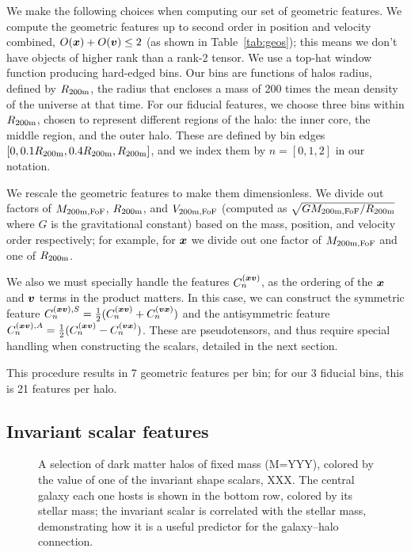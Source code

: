 We make the following choices when computing our set of geometric features.
We compute the geometric features up to second order in position and velocity combined, $O(\bm{x}) + O(\bm{v}) \leq 2$ (as shown in Table~\ref{tab:geos}); this means we don't have objects of higher rank than a rank-2 tensor.
We use a top-hat window function producing hard-edged bins. 
Our bins are functions of halos radius, defined by $R_\mathrm{200m}$, the radius that encloses a mass of 200 times the mean density of the universe at that time.
For our fiducial features, we choose three bins within $R_\mathrm{200m}$, chosen to represent different regions of the halo: the inner core, the middle region, and the outer halo.
These are defined by bin edges $[0, 0.1R_\mathrm{200m}, 0.4R_\mathrm{200m}, R_\mathrm{200m}]$, and we index them by $n=[0,1,2]$ in our notation.

We rescale the geometric features to make them dimensionless.
We divide out factors of $M_\mathrm{200m,FoF}$, $R_\mathrm{200m}$, and $V_\mathrm{200m,FoF}$ (computed as $\sqrt{GM_\mathrm{200m,FoF}/R_\mathrm{200m}}$ where $G$ is the gravitational constant) based on the mass, position, and velocity order respectively; for example, for $\bm{x}$ we divide out one factor of $M_\mathrm{200m,FoF}$ and one of $R_\mathrm{200m}$.

We also we must specially handle the features $C^{(\bm{x}\bm{v})}_n$, as the ordering of the $\bm{x}$ and $\bm{v}$ terms in the product matters.
In this case, we can construct the symmetric feature $ C^{(\bm{x}\bm{v}),S}_n = \frac{1}{2} (C^{(\bm{x}\bm{v})}_n + C^{(\bm{v}\bm{x})}_n)$ and the antisymmetric feature $C^{(\bm{x}\bm{v}),A}_n = \frac{1}{2} (C^{(\bm{x}\bm{v})}_n - C^{(\bm{v}\bm{x})}_n)$.
These are pseudotensors, and thus require special handling when constructing the scalars, detailed in the next section.

This procedure results in 7 geometric features per bin; for our 3 fiducial bins, this is 21 features per halo.

\subsection{Invariant scalar features}
\label{sec:scalar_features}

\begin{figure}
    \centering
    \caption{A selection of dark matter halos of fixed mass (M=YYY), colored by the value of one of the invariant shape scalars, XXX. The central galaxy each one hosts is shown in the bottom row, colored by its stellar mass; the invariant scalar is correlated with the stellar mass, demonstrating how it is a useful predictor for the galaxy--halo connection.}
    \label{fig:halo_viz}
\end{figure}


